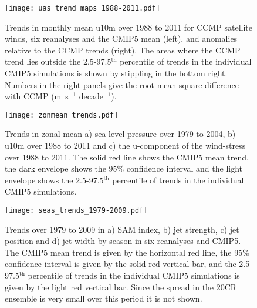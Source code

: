 \documentclass{ametsoc}
\begin{document}
\begin{figure}[t]
  \noindent\texttt{[image: uas\_trend\_maps\_1988-2011.pdf]}\\
  \caption{Trends in monthly mean u10m over 1988 to 2011 for CCMP satellite winds, six reanalyses and the 
  CMIP5 mean (left), and anomalies relative to the CCMP trends (right). The areas where the CCMP 
  trend lies outside the 2.5-97.5$^\textrm{th}$ percentile of trends in the individual CMIP5
   simulations is shown by stippling in the bottom right. Numbers in the right panels give
    the root mean square difference with CCMP (m~s$^{-1}$ decade$^{-1}$). }\label{fig:uas_trend_maps_1988-2011}
\end{figure}

\begin{figure}[t]
  \noindent\texttt{[image: zonmean\_trends.pdf]}\\
  \caption{Trends in zonal mean a) sea-level pressure over 1979 to 2004,
  b) u10m over 1988 to 2011 and c) the u-component of the wind-stress over 1988 to 2011. The 
  solid red line shows the CMIP5 mean trend, the dark envelope shows the 95\% confidence
   interval and the light envelope shows the 2.5-97.5$^\textrm{th}$ percentile of trends in 
   the individual 
  CMIP5 simulations.}\label{fig:zonmean_trends}
\end{figure}

\begin{figure}[t]
  \noindent\texttt{[image: seas\_trends\_1979-2009.pdf]}\\
  \caption{Trends over 1979 to 2009 in a) SAM index, b) jet strength, c) jet position and
   d) jet width by season in six reanalyses and CMIP5. The CMIP5 mean trend is given by
    the horizontal red line, the 95\% confidence interval is given by the solid red 
    vertical bar, and the 2.5-97.5$^\textrm{th}$ percentile of trends in the individual CMIP5 
    simulations is given by the light red vertical 
  bar. Since the spread in the 20CR ensemble is very small over this period it is not shown.
  }\label{fig:seas_trends_1979-2009}
\end{figure}
\end{document}
